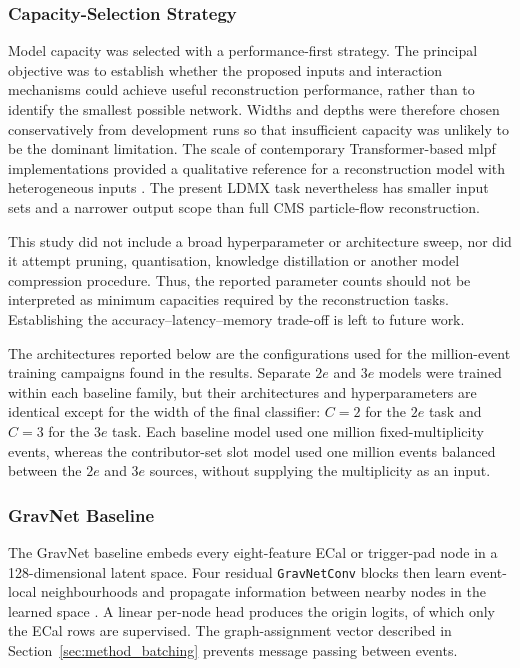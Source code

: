 \subsubsection{Capacity-Selection Strategy}
\label{sec:method_capacity_selection}

Model capacity was selected with a performance-first strategy. The principal
objective was to establish whether the proposed inputs and interaction
mechanisms could achieve useful reconstruction performance, rather than to
identify the smallest possible network. Widths and depths were therefore
chosen conservatively from development runs so that insufficient capacity was
unlikely to be the dominant limitation. The scale of contemporary
Transformer-based \gls{mlpf} implementations provided a qualitative reference
for a reconstruction model with heterogeneous inputs
\cite{pata2026-mlpf}. The present LDMX task nevertheless has smaller input
sets and a narrower output scope than full CMS particle-flow reconstruction.

This study did not include a broad hyperparameter or architecture sweep, nor
did it attempt pruning, quantisation, knowledge distillation or another model
compression procedure. Thus, the reported parameter counts should not be interpreted as
minimum capacities required by the reconstruction tasks. Establishing the
accuracy--latency--memory trade-off is left to future work.

The architectures reported below are the configurations used for the
million-event training campaigns found in the results. Separate \(2e\) and \(3e\) models were
trained within each baseline family, but their architectures and
hyperparameters are identical except for the width of the final classifier:
\(C=2\) for the \(2e\) task and \(C=3\) for the \(3e\) task. Each baseline model used one million
fixed-multiplicity events, whereas the contributor-set slot model used one
million events balanced between the \(2e\) and \(3e\) sources, without
supplying the multiplicity as an input.



\subsubsection{GravNet Baseline}

The GravNet baseline embeds every eight-feature ECal or trigger-pad node in a
128-dimensional latent space. Four residual \texttt{GravNetConv} blocks then
learn event-local neighbourhoods and propagate information between nearby
nodes in the learned space \cite{qasim2019-gravnet}. A linear per-node head
produces the origin logits, of which only the ECal rows are supervised. The
graph-assignment vector described in
Section~\ref{sec:method_batching} prevents message passing between events.

